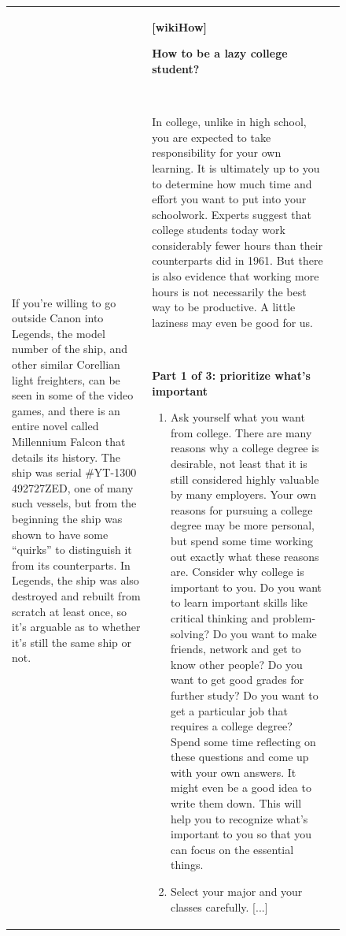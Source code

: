 \documentclass{article}
\begin{document}
\begin{figure}[p]
\begin{tabular}{@{}p{}p{}p{}@{}}
    ~
    
    If you're willing to go outside Canon into Legends, the model number of the ship, and other similar Corellian light freighters, can be seen in some of the video games, and there is an entire novel called Millennium Falcon that details its history. The ship was serial \#YT-1300 492727ZED, one of many such vessels, but from the beginning the ship was shown to have some ``quirks'' to distinguish it from its counterparts. In Legends, the ship was also destroyed and rebuilt from scratch at least once, so it's arguable as to whether it's still the same ship or not.
    
    &
    \textbf{[wikiHow]}
    
    \textcolor[HTML]{3078BE}{\textbf{How to be a lazy college student?}}

    ~

    In college, unlike in high school, you are expected to take responsibility for your own learning.  It is ultimately up to you to determine how much time and effort you want to put into your schoolwork. Experts suggest that college students today work considerably fewer hours than their counterparts did in 1961.  But there is also evidence that working more hours is not necessarily the best way to be productive. A little laziness may even be good for us.

    ~
    
    \textbf{Part 1 of 3: prioritize what's important}
    \begin{enumerate}[leftmargin=8pt]
        \item Ask yourself what you want from college. There are many reasons why a college degree is desirable, not least that it is still considered highly valuable by many employers. Your own reasons for pursuing a college degree may be more personal, but spend some time working out exactly what these reasons are. Consider why college is important to you. Do you want to learn important skills like critical thinking and problem-solving? Do you want to make friends, network and get to know other people? Do you want to get good grades for further study? Do you want to get a particular job that requires a college degree? Spend some time reflecting on these questions and come up with your own answers. It might even be a good idea to write them down. This will help you to recognize what's important to you so that you can focus on the essential things.
        \item Select your major and your classes carefully. \textcolor[HTML]{808080}{[...]}
    \end{enumerate}


\end{tabular}
\end{figure}
\end{document}
